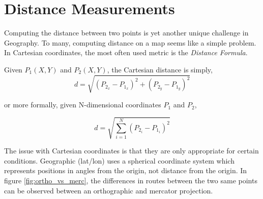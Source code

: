 %



\section*{Distance Measurements}

Computing the distance between two points is yet another unique challenge in 
Geography.  To many, computing distance on a map seems like a simple problem. 
In Cartesian coordinates, the most often used metric is the \emph{Distance Formula}.

Given $P_1 (X,Y)$ and $P_2 (X,Y)$, the Cartesian distance is simply,
\begin{equation}
d = \sqrt{ \left(P_{2_x} - P_{1_x} \right)^2 + \left(P_{2_y} - P_{1_y} \right)^2}
\end{equation}

or more formally, given N-dimensional coordinates $P_1$ and $P_2$,

\begin{equation}
d = \sqrt{ \sum^{N}_{i=1} (P_{2_i} - P_{1_i} )^2}
\end{equation}


The issue with Cartesian coordinates is that they are only appropriate for certain
conditions.  Geographic (lat/lon) uses a spherical coordinate system which represents positions
in angles from the origin, not distance from the origin.  In figure \ref{fig:ortho_vs_merc}, 
the differences in routes between the two same points can be observed between
an orthographic and mercator projection.

